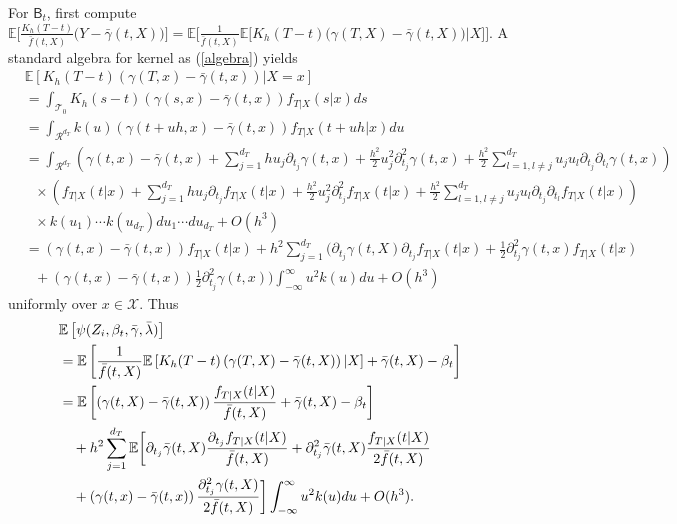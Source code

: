 \documentclass[lettersize, 12pt]{article}
\begin{document}
For $\mathsf{B}_t$, first compute 
$ \mathbb{E}\Big[ 
\frac{K_h(T-t)}{\bar f(t,X)} \big(Y - \bar{\gamma}(t, X)\big)
\Big]
= 
\mathbb{E}\Big[ 
\frac{1}{\bar f(t,X)} \mathbb{E}\Big[K_h(T-t)\big({\gamma}(T,X) - \bar{\gamma}(t, X)\big)
|X\big]\Big]$.
A standard algebra for kernel as (\ref{algebra}) yields
\begin{align*}
&\mathbb{E}\left[K_h(T-t)\left({\gamma}(T,x) - \bar{\gamma}(t, x)\right)
|X=x\right]
\\
&=
\int_{\mathcal{T}_0} K_h(s-t)\left(\gamma(s,x) - \bar{\gamma}(t, x)\right) f_{T|X}(s|x) ds  \\
&= 
\int_{\mathcal{R}^{d_T}} k(u)\left(\gamma(t +uh,x) - \bar{\gamma}(t, x)\right) f_{T|X}(t+uh|x) du \\
&= 
\int_{\mathcal{R}^{d_T}}   \left( \gamma(t,x) - \bar\gamma(t,x) +\sum_{j=1}^{d_T} h u_j \partial_{t_j} {\gamma}(t, x) +  \frac{h^2}{2} u_j^2 \partial^2_{t_j} {\gamma}(t, x)
+  \frac{h^2}{2}\sum_{l=1, l\neq j}^{d_T} u_j u_l \partial_{t_j}\partial_{t_l} {\gamma}(t,x)
\right) 
\\
&\ \ \ \times
\left( f_{T|X}(t|x) +  \sum_{j=1}^{d_T} h u_j  \partial_{t_j} f_{T|X}(t|x) 
+ \frac{h^2}{2} u_j^2 \partial^2_{t_j} f_{T|X}(t|x)
+  \frac{h^2}{2}\sum_{l=1, l\neq j}^{d_T} u_j u_l \partial_{t_j}\partial_{t_l} f_{T|X}(t|x)
\right) 
\\
&\ \ \ \times
k(u_1)\cdots k(u_{d_T})du_1\cdots du_{d_T} + O(h^3) \\
&= 
\left(\gamma(t,x) - \bar\gamma(t,x)\right) f_{T|X}(t|x)
+ 
h^2  \sum_{j=1}^{d_T}\bigg(
\partial_{t_j} {\gamma}(t,X)\partial_{t_j} f_{T|X}(t|x)
+ \frac{1}{2}\partial_{t_j}^2 {\gamma}(t,x) f_{T|X}(t|x)
\\
&\ \ \ 
+
\left( \gamma(t,x) - \bar\gamma(t,x) \right)
\frac{1}{2}\partial^2_{t_j} {\gamma}(t, x)
\bigg)\int_{-\infty}^\infty u^2k(u) du
+ O(h^3)
\end{align*}
uniformly over $x \in \mathcal{X}$.
Thus 
\begin{align}
&\mathbb{E}\left[\psi(Z_i, \beta_t, \bar\gamma, \bar\lambda)\right]
\notag
\\
&= \mathbb{E}\left[ 
\frac{1}{\bar f(t,X)} \mathbb{E}\left[K_h(T-t)\left({\gamma}(T,X) - \bar{\gamma}(t, X)\right)
|X\right] + \bar\gamma(t, X) - \beta_t\right]
\notag \\
&= 
\mathbb{E}\left[
\left(\gamma(t,X) - \bar\gamma(t,X)\right) \frac{f_{T|X}(t|X)}{\bar f(t,X)}
+ \bar\gamma(t, X) - \beta_t
\right]
\label{AEDR}
\\
&\ \ \ + h^2\sum_{j=1}^{d_T} \mathbb{E}\bigg[
\partial_{t_j} \bar{\gamma}(t,X)\frac{\partial_{t_j} f_{T|X}(t|X)}{\bar f(t,X)}
+ \partial_{t_j}^2 \bar{\gamma}(t,X) \frac{f_{T|X}(t|X)}{2 \bar f(t,X)}
\notag
\\
&\ \ \ + 
\left( \gamma(t,x) - \bar\gamma(t,x) \right)
\frac{\partial^2_{t_j} {\gamma}(t, X)}{2\bar f(t,X)}
\bigg]  \int_{-\infty}^\infty u^2k(u) du  + O(h^3).
\notag
\end{align}
\end{document}
